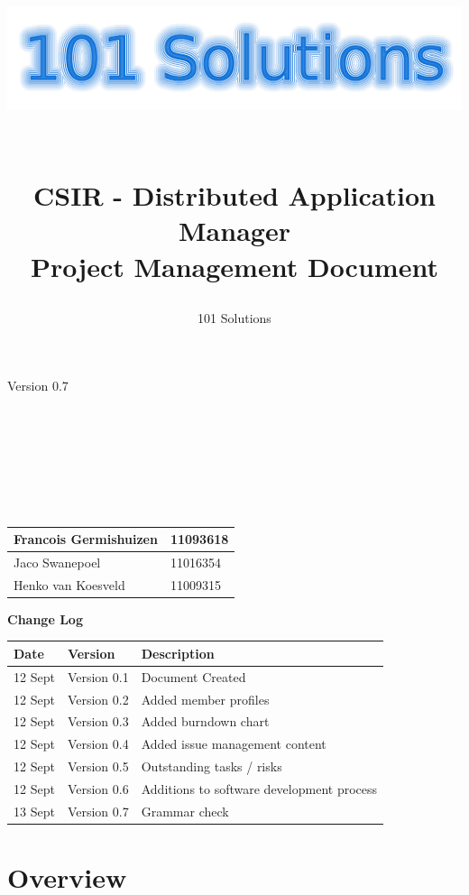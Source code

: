 \documentclass[a4paper,12pt,final]{article}
\title{
\begin{center}
  	\includegraphics[scale=0.3]{101Logo.png} 
  \end{center}
  \textbf{\\}
CSIR - Distributed Application Manager\\
Project Management Document\\
}
\author{101 Solutions}
\begin{document}
\maketitle
\begin{center}
Version 0.7
\end{center}
\textbf{\\}
\textbf{\\}
\textbf{\\}
\textbf{\\}
\textbf{\\}
\textbf{\\}
\begin{center}
\begin{tabular}{|l|l|}
\hline
Francois Germishuizen & 11093618\\
\hline
Jaco Swanepoel & 11016354\\
\hline
Henko van Koesveld & 11009315\\
\hline
\end{tabular}
\end{center}
\thispagestyle{empty}
\newpage
\thispagestyle{empty}
\textbf{\large{Change Log}}
\vspace{6pt}\newline
\begin{tabular}{|l|l|l|}
\hline
Date & Version & Description\\
\hline
12 Sept & Version 0.1 & Document Created\\
\hline
12 Sept & Version 0.2 & Added member profiles\\
\hline
12 Sept & Version 0.3 & Added burndown chart\\
\hline
12 Sept & Version 0.4 & Added issue management content\\
\hline
12 Sept & Version 0.5 & Outstanding tasks / risks\\
\hline
12 Sept & Version 0.6 & Additions to  software development process\\
\hline
13 Sept & Version 0.7 & Grammar check\\
\hline
\end{tabular}
\newpage
\tableofcontents
\thispagestyle{empty}
\newpage

\section{Overview}
\end{document}
